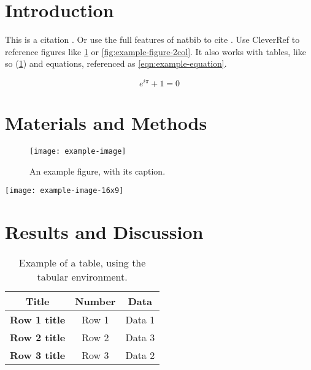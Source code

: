 \documentclass[
    9pt,            %
    twocolumn,      %
    commun,         %
    lineno,         %
    tocfig,         %
]{pi-article}
\begin{document}



\section{Introduction}
This is a citation \citep{A01}. Or use the full features of natbib to cite \citet{B02}.
Use CleverRef to reference figures like \cref{fig:example-figure} or \cref{fig:example-figure-2col}.
It also works with tables, like so (\cref{tbl:example-table}) and equations, referenced as \cref{eqn:example-equation}.

\begin{equation}\label{eqn:example-equation}
    e^{i\pi} + 1 = 0
\end{equation}

\lipsum[1-1] %

\section{Materials and Methods}
\lipsum[2-4] %

\begin{figure}[!htb]
    \centering
    \texttt{[image: example-image]}
    \caption{%
        An example figure, with its caption.
    }\label{fig:example-figure}
\end{figure}

\begin{figure*}[!htb]
    \centering
    \texttt{[image: example-image-16x9]}
    \caption{%
        An example 2-column figure, with its caption. In 1-column mode it appears as a normal figure.
    }\label{fig:example-figure-2col}
\end{figure*}

\lipsum[2-4] %

\section{Results and Discussion}
\lipsum[4-5] %

\begin{table}[htb]
    \caption{%
        Example of a table, using the tabular environment.
    }\label{tbl:example-table}
    \centering
    \begin{tabular}[]{@{}ccc@{}}
    \toprule
    Title & Number & Data \\
    \midrule
    \textbf{Row 1 title} & Row 1 & Data 1 \\
    \textbf{Row 2 title} & Row 2 & Data 3 \\
    \textbf{Row 3 title} & Row 3 & Data 2 \\
    \bottomrule
    \end{tabular}
\end{table}
\end{document}
